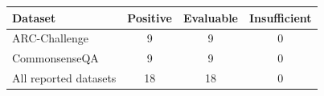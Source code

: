 \begin{tabular}{@{}lccc@{}}
\toprule
Dataset & Positive & Evaluable & Insufficient \\
\midrule
ARC-Challenge & 9 & 9 & 0 \\
CommonsenseQA & 9 & 9 & 0 \\
All reported datasets & 18 & 18 & 0 \\
\bottomrule
\end{tabular}
